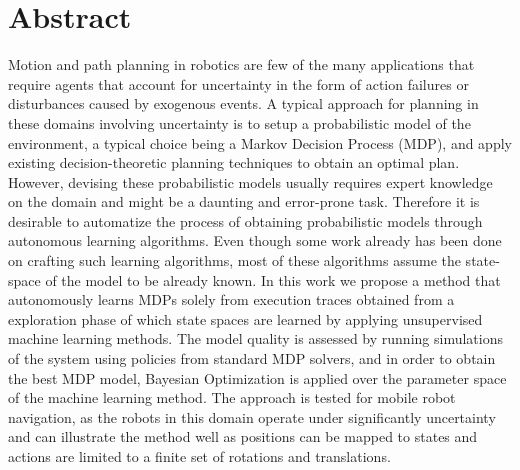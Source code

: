 \chapter*{Abstract}
\label{ch:abstract}

Motion and path planning in robotics are few of the many applications that require agents that account for uncertainty in the form of action failures or disturbances caused by exogenous events.
A typical approach for planning in these domains involving uncertainty is to setup a probabilistic model of the environment, a typical choice being a Markov Decision Process (MDP), and apply existing decision-theoretic planning techniques to obtain an optimal plan.
However, devising these probabilistic models usually requires expert knowledge on the domain and might be a daunting and error-prone task.
Therefore it is desirable to automatize the process of obtaining probabilistic models through autonomous learning algorithms.
Even though some work already has been done on crafting such learning algorithms, most of these algorithms assume the state-space of the model to be already known.
In this work we propose a method that autonomously learns MDPs solely from execution traces obtained from a exploration phase of which state spaces are learned by applying unsupervised machine learning methods.
The model quality is assessed by running simulations of the system using policies from standard MDP solvers, and in order to obtain the best MDP model, Bayesian Optimization is applied over the parameter space of the machine learning method.
The approach is tested for mobile robot navigation, as the robots in this domain operate under significantly uncertainty and can illustrate the method well as positions can be mapped to states and actions are limited to a finite set of rotations and translations.